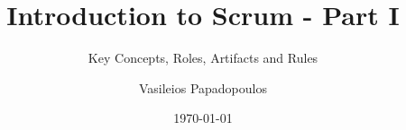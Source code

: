 \documentclass[aspectratio=169,xcolor=dvipsnames]{beamer}
\title[Introduction to Scrum - Part I]{Introduction to Scrum - Part I}
\subtitle{Key Concepts, Roles, Artifacts and Rules}
\author{Vasileios Papadopoulos}
\institute[]{}
\date{\today}
\begin{document}
    \begin{frame}
    	\titlepage
    \end{frame}
    
    
    
    
    
    
    
    
    
    
\end{document}
